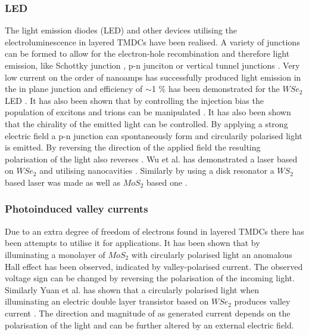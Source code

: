 \subsubsection{LED}

The light emission diodes (LED) and other devices utilising the electroluminescence in layered TMDCs have been realised. A variety of junctions can be formed to allow for the electron-hole recombination and therefore light emission, like Schottky junction \cite{Sundaram2013}, p-n junciton \cite{Ross2014}\cite{Cheng2014}\cite{Pospischil2014} or vertical tunnel junctions \cite{Withers2015}. Very low current on the order of nanoamps has successfully produced light emission in the in plane junction and efficiency of $\sim$1 \% has been demonstrated for the $WSe_2$ LED \cite{Ross2014}\cite{Pospischil2014}. It has also been shown that by controlling the injection bias the population of excitons and trions can be manipulated \cite{Ross2014}\cite{Withers2015}\cite{Mak2016}. It has also been shown that the chirality of the emitted light can be controlled. By applying a strong electric field a p-n junction can spontaneously form and circularily polarised light is emitted. By reversing the direction of the applied field the resulting polarisation of the light also reverses \cite{Zhang2014b}. Wu et al. has demonstrated a laser based on $WSe_2$ and utilising nanocavities \cite{Wu2015}. Similarly by using a disk resonator a $WS_2$ based laser was made \cite{Ye2015} as well as $MoS_2$ based one \cite{Salehzadeh2015}.

\subsubsection{Photoinduced valley currents}

Due to an extra degree of freedom of electrons found in layered TMDCs there has been attempts to utilise it for applications. It has been shown that by illuminating a monolayer of $MoS_2$ with circularly polarised light an anomalous Hall effect has been observed, indicated by valley-polarised current. The observed voltage sign can be changed by reversing the polarisation of the incoming light\cite{Mak2014}. Similarly Yuan et al. has shown that a circularly polarised light when illuminating an electric double layer transistor based on $WSe_2$ produces valley current \cite{Yuan2014}. The direction and magnitude of as generated current depends on the polarisation of the light and can be further altered by an external electric field.

